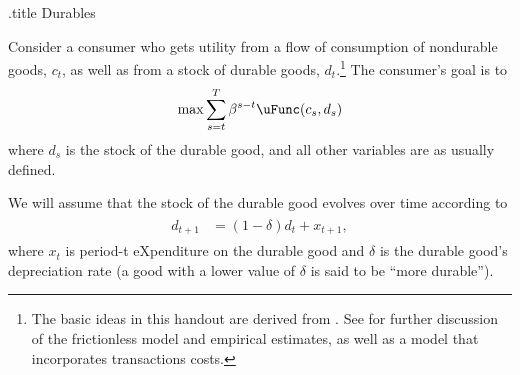 \documentclass{handout}
\begin{document}
\handoutHeader


\begin{verbatimwrite}{\jobname.title}
Durables
\end{verbatimwrite}

\handoutNameMake




Consider a consumer who gets utility from a flow of consumption of 
nondurable goods, $c_{t}$, as well as from a stock of durable goods, 
$d_{t}$.\footnote{The basic ideas in this handout
are derived from \cite{mankiw:durgoods}.  See \cite{cdSs} for further discussion 
of the frictionless model and empirical estimates, as well as a model that incorporates transactions costs.}  The consumer's goal is to 
\begin{equation}
        \max \sum_{s=t}^{T} \beta^{s-t} \uFunc(c_{s},d_{s})
\end{equation}
where $d_{s}$ is the stock of the durable good, and all other 
variables are as usually defined.

We will assume that the stock of the durable good evolves over 
time according to 
\begin{equation}\begin{gathered}\begin{aligned}
        d_{t+1} & =  (1-\delta)d_{t}+{x}_{t+1}, \label{eq:zeqn}
\end{aligned}\end{gathered}\end{equation}
where ${x}_{t}$ is period-t eXpenditure on the durable good and $\delta$ 
is the durable good's depreciation rate (a good with a lower value of 
$\delta $ is said to be ``more durable'').
\end{document}
